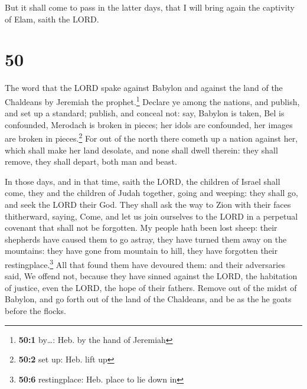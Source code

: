  But it shall come to pass in the latter days, that I
will bring again the captivity of Elam, saith the LORD.

\hypertarget{section-49}{%
\section{50}\label{section-49}}

 The word that the LORD spake against Babylon and against
the land of the Chaldeans by Jeremiah the prophet.\footnote{\textbf{50:1}
  by\ldots: Heb. by the hand of Jeremiah}  Declare ye
among the nations, and publish, and set up a standard; publish, and
conceal not: say, Babylon is taken, Bel is confounded, Merodach is
broken in pieces; her idols are confounded, her images are broken in
pieces.\footnote{\textbf{50:2} set up: Heb. lift up}  For
out of the north there cometh up a nation against her, which shall make
her land desolate, and none shall dwell therein: they shall remove, they
shall depart, both man and beast.

 In those days, and in that time, saith the LORD, the
children of Israel shall come, they and the children of Judah together,
going and weeping: they shall go, and seek the LORD their God.
 They shall ask the way to Zion with their faces
thitherward, saying, Come, and let us join ourselves to the LORD in a
perpetual covenant that shall not be forgotten.  My people
hath been lost sheep: their shepherds have caused them to go astray,
they have turned them away on the mountains: they have gone from
mountain to hill, they have forgotten their restingplace.\footnote{\textbf{50:6}
  restingplace: Heb. place to lie down in}  All that found
them have devoured them: and their adversaries said, We offend not,
because they have sinned against the LORD, the habitation of justice,
even the LORD, the hope of their fathers.  Remove out of
the midst of Babylon, and go forth out of the land of the Chaldeans, and
be as the he goats before the flocks.

